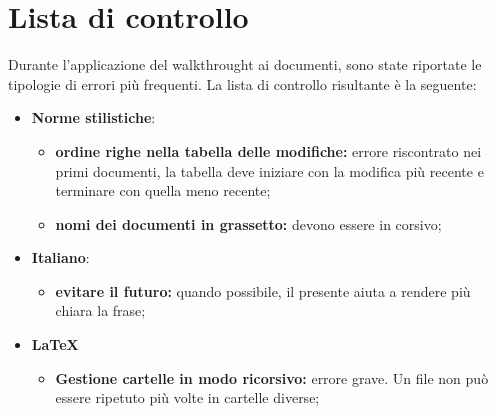 \chapter{Lista di controllo}
Durante l'applicazione del walkthrought ai documenti, sono state riportate le tipologie di errori più frequenti. La lista di controllo risultante è la seguente:
\begin{itemize}
	\item \textbf{Norme stilistiche}:
	\begin{itemize}
		\item \textbf{ordine righe nella tabella delle modifiche:} errore riscontrato nei primi documenti, la tabella deve iniziare con la modifica più recente e terminare con quella meno recente;
		\item \textbf{nomi dei documenti in grassetto:} devono essere in corsivo;
	\end{itemize}
	\item \textbf{Italiano}:
	\begin{itemize}
		\item \textbf{evitare il futuro:} quando possibile, il presente aiuta a rendere più chiara la frase;
	\end{itemize}
	\item \textbf{\LaTeX}
	\begin{itemize}
		\item \textbf{Gestione cartelle in modo ricorsivo:} errore grave. Un file non può essere ripetuto più volte in cartelle diverse;
	\end{itemize}
\end{itemize}